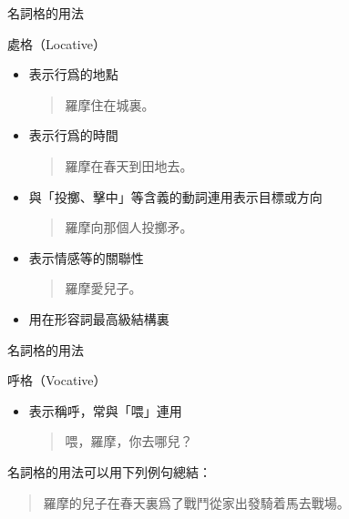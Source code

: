 \documentclass[aspectratio=169]{beamer}
\begin{document}
\begin{frame}{名詞格的用法}
    \begin{block}{處格（Locative）}
        \begin{itemize}
            \item 表示行爲的地點\\
            \begin{quotation}
                \rmfamily
                 羅摩住在城裏。
            \end{quotation}
            \item 表示行爲的時間\\
            \begin{quotation}
                \rmfamily
                 羅摩在春天到田地去。
            \end{quotation}
            \item 與「投擲、擊中」等含義的動詞連用表示目標或方向\\
            \begin{quotation}
                \rmfamily
                 羅摩向那個人投擲矛。
            \end{quotation}
            \item 表示情感等的關聯性\\
            \begin{quotation}
                \rmfamily
                 羅摩愛兒子。
            \end{quotation}
            \item 用在形容詞最高級結構裏
        \end{itemize}
    \end{block}
\end{frame}

\begin{frame}{名詞格的用法}
    \begin{block}{呼格（Vocative）}
        \begin{itemize}
            \item 表示稱呼，常與\SA{}「喂」連用\\
            \begin{quotation}
                \rmfamily
                 喂，羅摩，你去哪兒？
            \end{quotation}
        \end{itemize}
    \end{block}

    名詞格的用法可以用下列例句總結：

    \begin{quotation}\rmfamily

        羅摩的兒子在春天裏爲了戰鬥從家出發騎着馬去戰場。
    \end{quotation}
\end{frame}
\end{document}
